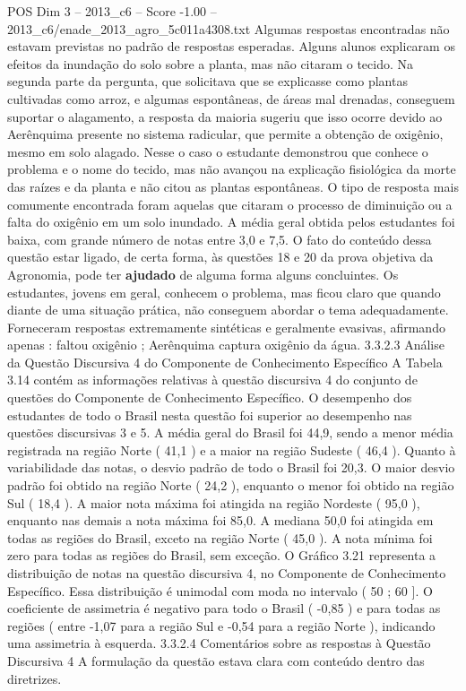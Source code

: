 \begin{textsample}{POS Dim 3 – 2013\_c6 – Score -1.00 – 2013\_c6/enade\_2013\_agro\_5c011a4308.txt}
Algumas respostas encontradas não estavam previstas no padrão de respostas esperadas.
Alguns alunos explicaram os efeitos da inundação do solo sobre a planta, mas não citaram o tecido.
Na segunda parte da pergunta, que solicitava que se explicasse como plantas cultivadas como arroz, e algumas espontâneas, de áreas mal drenadas, conseguem suportar o alagamento, a resposta da maioria sugeriu que isso ocorre devido ao Aerênquima presente no sistema radicular, que permite a obtenção de oxigênio, mesmo em solo alagado.
Nesse o caso o estudante demonstrou que conhece o problema e o nome do tecido, mas não avançou na explicação fisiológica da morte das raízes e da planta e não citou as plantas espontâneas.
O tipo de resposta mais comumente encontrada foram aquelas que citaram o processo de diminuição ou a falta do oxigênio em um solo inundado.
A média geral obtida pelos estudantes foi baixa, com grande número de notas entre 3,0 e 7,5.
O fato do conteúdo dessa questão estar ligado, de certa forma, às questões 18 e 20 da prova objetiva da Agronomia, pode ter \textbf{ajudado} de alguma forma alguns concluintes.
Os estudantes, jovens em geral, conhecem o problema, mas ficou claro que quando diante de uma situação prática, não conseguem abordar o tema adequadamente.
Forneceram respostas extremamente sintéticas e geralmente evasivas, afirmando apenas : faltou oxigênio ; Aerênquima captura oxigênio da água. 3.3.2.3 Análise da Questão Discursiva 4 do Componente de Conhecimento Específico A Tabela 3.14 contém as informações relativas à questão discursiva 4 do conjunto de questões do Componente de Conhecimento Específico.
O desempenho dos estudantes de todo o Brasil nesta questão foi superior ao desempenho nas questões discursivas 3 e 5.
A média geral do Brasil foi 44,9, sendo a menor média registrada na região Norte ( 41,1 ) e a maior na região Sudeste ( 46,4 ).
Quanto à variabilidade das notas, o desvio padrão de todo o Brasil foi 20,3.
O maior desvio padrão foi obtido na região Norte ( 24,2 ), enquanto o menor foi obtido na região Sul ( 18,4 ).
A maior nota máxima foi atingida na região Nordeste ( 95,0 ), enquanto nas demais a nota máxima foi 85,0.
A mediana 50,0 foi atingida em todas as regiões do Brasil, exceto na região Norte ( 45,0 ).
A nota mínima foi zero para todas as regiões do Brasil, sem exceção.
O Gráfico 3.21 representa a distribuição de notas na questão discursiva 4, no Componente de Conhecimento Específico.
Essa distribuição é unimodal com moda no intervalo ( 50 ; 60 ].
O coeficiente de assimetria é negativo para todo o Brasil ( -0,85 ) e para todas as regiões ( entre -1,07 para a região Sul e -0,54 para a região Norte ), indicando uma assimetria à esquerda. 3.3.2.4 Comentários sobre as respostas à Questão Discursiva 4 A formulação da questão estava clara com conteúdo dentro das diretrizes.

\end{textsample}
